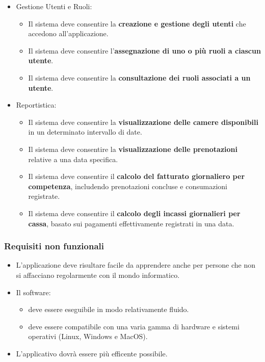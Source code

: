 \documentclass[a4paper,12pt]{report}
\begin{document}
\begin{itemize}
    \item Gestione Utenti e Ruoli:
          \begin{itemize}
              \item Il sistema deve consentire la \textbf{creazione e gestione degli utenti} che accedono all'applicazione.
              \item Il sistema deve consentire l'\textbf{assegnazione di uno o più ruoli a ciascun utente}.
              \item Il sistema deve consentire la \textbf{consultazione dei ruoli associati a un utente}.
          \end{itemize}
    \item Reportistica:
          \begin{itemize}
              \item Il sistema deve consentire la \textbf{visualizzazione delle camere disponibili} in un determinato intervallo di date.
              \item Il sistema deve consentire la \textbf{visualizzazione delle prenotazioni} relative a una data specifica.
              \item Il sistema deve consentire il \textbf{calcolo del fatturato giornaliero per competenza}, includendo prenotazioni concluse e consumazioni registrate.
              \item Il sistema deve consentire il \textbf{calcolo degli incassi giornalieri per cassa}, basato sui pagamenti effettivamente registrati in una data.
          \end{itemize}
\end{itemize}

\subsubsection{Requisiti non funzionali}
\begin{itemize}
    \item L’applicazione deve risultare facile da apprendere anche per persone che non si affacciano regolarmente con il mondo informatico.
    \item Il software:
          \begin{itemize}
              \item deve essere eseguibile in modo relativamente fluido.
              \item deve essere compatibile con una varia gamma di hardware e sistemi operativi (Linux, Windows e MacOS).
          \end{itemize}
    \item L'applicativo dovrà essere più efficente possibile.
\end{itemize}
\end{document}
